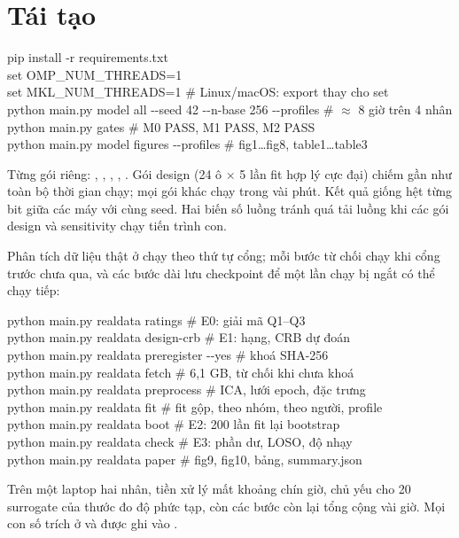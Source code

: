 \section{Tái tạo}
\label{app:repro}

\begin{tcolorbox}[algbox]
\small\ttfamily
pip install -r requirements.txt\\
set OMP\_NUM\_THREADS=1\\
set MKL\_NUM\_THREADS=1 \quad \# Linux/macOS: export thay cho set\\
python main.py model all -{}-seed 42 -{}-n-base 256 -{}-profiles \quad \# $\approx$ 8 giờ trên 4 nhân\\
python main.py gates \quad \# M0 PASS, M1 PASS, M2 PASS\\
python main.py model figures -{}-profiles \quad \# fig1\ldots fig8, table1\ldots table3
\end{tcolorbox}
Từng gói riêng: , , , , . Gói design (24 ô $\times$ 5 lần fit hợp lý cực đại) chiếm gần như toàn bộ thời gian chạy; mọi gói khác chạy trong vài phút. Kết quả giống hệt từng bit giữa các máy với cùng seed. Hai biến số luồng tránh quá tải luồng khi các gói design và sensitivity chạy tiến trình con.

Phân tích dữ liệu thật ở  chạy theo thứ tự cổng; mỗi bước từ chối chạy khi cổng trước chưa qua, và các bước dài lưu checkpoint để một lần chạy bị ngắt có thể chạy tiếp:
\begin{tcolorbox}[algbox]
\small\ttfamily
python main.py realdata ratings \quad \# E0: giải mã Q1--Q3\\
python main.py realdata design-crb \quad \# E1: hạng, CRB dự đoán\\
python main.py realdata preregister -{}-yes \quad \# khoá SHA-256\\
python main.py realdata fetch \quad \# 6,1 GB, từ chối khi chưa khoá\\
python main.py realdata preprocess \quad \# ICA, lưới epoch, đặc trưng\\
python main.py realdata fit \quad \# fit gộp, theo nhóm, theo người, profile\\
python main.py realdata boot \quad \# E2: 200 lần fit lại bootstrap\\
python main.py realdata check \quad \# E3: phần dư, LOSO, độ nhạy\\
python main.py realdata paper \quad \# fig9, fig10, bảng, summary.json
\end{tcolorbox}
Trên một laptop hai nhân, tiền xử lý mất khoảng chín giờ, chủ yếu cho 20 surrogate của thước đo độ phức tạp, còn các bước còn lại tổng cộng vài giờ. Mọi con số trích ở  và  được ghi vào .

